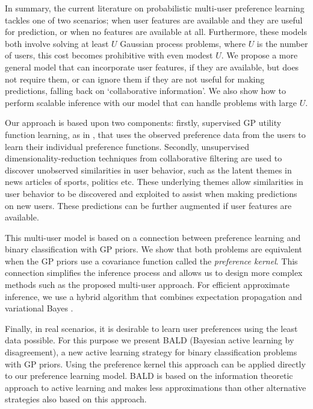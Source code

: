 In summary, the current literature on probabilistic multi-user preference learning
tackles one of two scenarios; when user features are available and they are useful
for prediction, or when no features are available at all.
Furthermore, these models both involve solving at least $U$ Gaussian process problems, 
where $U$ is the number of users, this cost becomes prohibitive with even modest $U$.
We propose a more general model that can incorporate user features, if they are available,
but does not require them, or can ignore them if they are not useful for making predictions,
falling back on `collaborative information'.
We also show how to perform scalable inference with our model that can handle problems
with large $U$.

Our approach is based upon two components: firstly, supervised GP utility function learning, as in \citep{chu2005}, that uses the observed preference data from the users to learn their individual
preference functions. Secondly, unsupervised dimensionality-reduction techniques from collaborative filtering \citep{koren2008,stern2009} are used to discover unobserved similarities in user behavior, such as the latent themes in news articles of sports, politics etc. These underlying themes allow similarities in user behavior to be discovered and exploited to assist when making predictions on new users. These predictions can be further augmented if user features are available. 

This multi-user model is based on a connection between preference learning and binary classification with GP priors.
We show that both problems are equivalent when the GP priors use a 
covariance function called the \emph{preference kernel}. This connection simplifies the inference process
and allows us to design more complex methods such as the proposed multi-user approach.
For efficient approximate inference, we use a hybrid algorithm that combines
expectation propagation and variational Bayes \citep{Minka2001,Attias1999}.

Finally, in real scenarios, it is desirable to learn user preferences
using the least data possible. For this purpose we present BALD (Bayesian active learning by disagreement),
a new active learning strategy for binary classification problems with GP priors.
Using the preference kernel this approach can be applied directly to our preference learning model.
BALD is based on the information theoretic approach to active learning
and makes less approximations than other alternative strategies also based on this approach.

